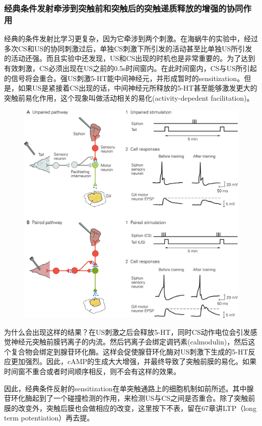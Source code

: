 \documentclass[UTF8,nofonts]{ctexart}
\begin{document}
\subsubsection{经典条件发射牵涉到突触前和突触后的突触递质释放的增强的协同作用}
经典的条件发射比学习更复杂，因为它牵涉到两个刺激。在海蜗牛的实验中，经过多次CS和US的协同刺激过后，单独CS刺激下所引发的活动甚至比单独US所引发的活动还强。而且实验中还发现，US和CS出现的时机也是非常重要的。为了达到有效刺激，CS必须出现在US之前的0.5s时间窗内。在此时间窗内，CS与US所引起的信号将会重合。强US刺激5-HT能中间神经元，并形成暂时的sensitization。但是，如果US是紧接着CS出现的话，中间神经元所释放的5-HT甚至能够激发更大的突触前易化作用，这个现象叫做活动相关的易化(activity-depedent facilitation)。
\begin{figure}[h]
	\centering
	\includegraphics[scale=1]{Pic/6605_PNS5.jpg}
\end{figure}
为什么会出现这样的结果？在US刺激之后会释放5-HT，同时CS动作电位会引发感觉神经元突触前膜钙离子的内流。然后钙离子会绑定调钙素(calmodulin)，然后这个复合物会绑定到腺苷环化酶。这样会促使腺苷环化酶对US刺激下生成的5-HT反应更加强烈。因此，cAMP的生成大大增强，并最终导致了突触前膜的易化。如果时间窗不重合或者时间顺序相反，则不会有这样的效果。
\par
因此，经典条件反射的sensitization在单突触通路上的细胞机制如前所述。其中腺苷环化酶起到了一个碰撞检测的作用，来检测US与CS之间是否重合。除了突触前膜的改变外，突触后膜也会做相应的改变，这里按下不表，留在67章讲LTP（long term potentiation）再去提。
\end{document}
